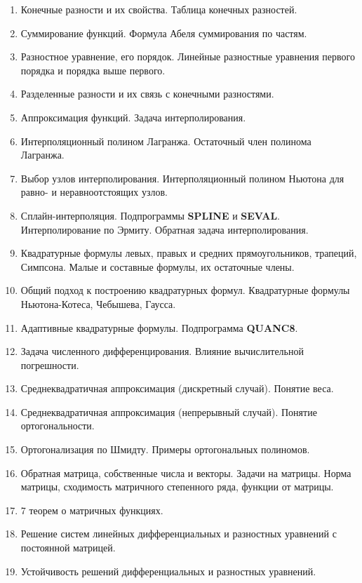 \documentclass[../../calc-math-exam-2023.tex]{subfiles}
\begin{document}
    \begin{enumerate}
        \item Конечные разности и их свойства. Таблица конечных разностей.
        \item Суммирование функций. Формула Абеля суммирования по частям.
        \item Разностное уравнение, его порядок. Линейные разностные уравнения первого порядка и порядка выше первого.
        \item Разделенные разности и их связь с конечными разностями.
        \item Аппроксимация функций. Задача интерполирования.
        \item Интерполяционный полином Лагранжа. Остаточный член полинома Лагранжа.
        \item Выбор узлов интерполирования. Интерполяционный полином Ньютона для равно- и неравноотстоящих узлов.
        \item Сплайн-интерполяция. Подпрограммы \textbf{SPLINE} и \textbf{SEVAL}. Интерполирование по Эрмиту. Обратная задача интерполирования.
        \item Квадратурные формулы левых, правых и средних прямоугольников, трапеций, Симпсона. Малые и составные формулы, их остаточные члены.
        \item Общий подход к построению квадратурных формул. Квадратурные формулы Ньютона-Котеса, Чебышева, Гаусса.
        \item Адаптивные квадратурные формулы. Подпрограмма \textbf{QUANC8}.
        \item Задача численного дифференцирования. Влияние вычислительной погрешности.
        \item Среднеквадратичная аппроксимация (дискретный случай). Понятие веса.
        \item Среднеквадратичная аппроксимация (непрерывный случай). Понятие ортогональности.
        \item Ортогонализация по Шмидту. Примеры ортогональных полиномов.
        \item Обратная матрица, собственные числа и векторы. Задачи на матрицы. Норма матрицы, сходимость матричного степенного ряда, функции от матрицы.
        \item 7 теорем о матричных функциях.
        \item Решение систем линейных дифференциальных и разностных уравнений с постоянной матрицей.
        \item Устойчивость решений дифференциальных и разностных уравнений.

\end{enumerate}
\end{document}
